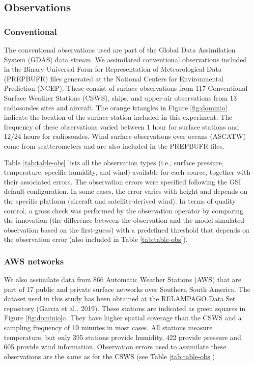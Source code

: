 \documentclass[final,5p,times,twocolumn,authoryear]{elsarticle} %
\begin{document}
\hypertarget{observations}{%
\subsection{Observations}\label{observations}}

\hypertarget{conventional}{%
\subsubsection{Conventional}\label{conventional}}

The conventional observations used are part of the Global Data Assimilation System (GDAS) data stream. We assimilated conventional observations included in the Binary Universal Form for Representation of Meteorological Data (PREPBUFR) files generated at the National Centers for Environmental Prediction (NCEP). These consist of surface observations from 117 Conventional Surface Weather Stations (CSWS), ships, and upper-air observations from 13 radiosondes sites and aircraft. The orange triangles in Figure \ref{fig:dominio} indicate the location of the surface station included in this experiment. The frequency of these observations varied between 1 hour for surface stations and 12/24 hours for radiosondes. Wind surface observations over oceans (ASCATW) come from scatterometers and are also included in the PREPBUFR files.

Table \ref{tab:table-obs} lists all the observation types (i.e., surface pressure, temperature, specific humidity, and wind) available for each source, together with their associated errors. The observation errors were specified following the GSI default configuration. In some cases, the error varies with height and depends on the specific platform (aircraft and satellite-derived wind). In terms of quality control, a gross check was performed by the observation operator by comparing the innovation (the difference between the observation and the model-simulated observation based on the first-guess) with a predefined threshold that depends on the observation error (also included in Table \ref{tab:table-obs}).

\hypertarget{aws-networks}{%
\subsubsection{AWS networks}\label{aws-networks}}

We also assimilate data from 866 Automatic Weather Stations (AWS) that are part of 17 public and private surface networks over Southern South America. The dataset used in this study has been obtained at the RELAMPAGO Data Set repository (Garcia et al., 2019). These stations are indicated as green squares in Figure \ref{fig:dominio}a. They have higher spatial coverage than the CSWS and a sampling frequency of 10 minutes in most cases. All stations measure temperature, but only 395 stations provide humidity, 422 provide pressure and 605 provide wind information.
Observation errors used to assimilate these observations are the same as for the CSWS (see Table \ref{tab:table-obs})
\end{document}

